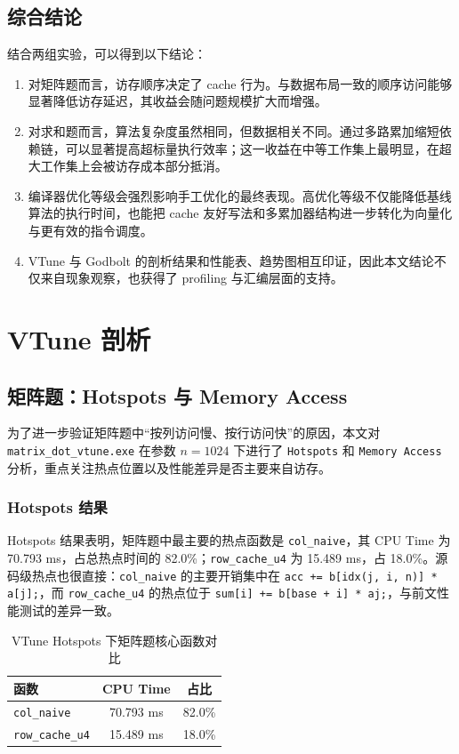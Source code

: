 \documentclass[a4paper]{article}
\begin{document}
\subsection{综合结论}
结合两组实验，可以得到以下结论：
\begin{enumerate}
 \item 对矩阵题而言，访存顺序决定了 cache 行为。与数据布局一致的顺序访问能够显著降低访存延迟，其收益会随问题规模扩大而增强。
  \item 对求和题而言，算法复杂度虽然相同，但数据相关不同。通过多路累加缩短依赖链，可以显著提高超标量执行效率；这一收益在中等工作集上最明显，在超大工作集上会被访存成本部分抵消。
  \item 编译器优化等级会强烈影响手工优化的最终表现。高优化等级不仅能降低基线算法的执行时间，也能把 cache 友好写法和多累加器结构进一步转化为向量化与更有效的指令调度。
  \item VTune 与 Godbolt 的剖析结果和性能表、趋势图相互印证，因此本文结论不仅来自现象观察，也获得了 profiling 与汇编层面的支持。
\end{enumerate}

\section{VTune 剖析}
\subsection{矩阵题：Hotspots 与 Memory Access}
为了进一步验证矩阵题中“按列访问慢、按行访问快”的原因，本文对 \texttt{matrix\_dot\_vtune.exe} 在参数 $n=1024$ 下进行了 \texttt{Hotspots} 和 \texttt{Memory Access} 分析，重点关注热点位置以及性能差异是否主要来自访存。

\subsubsection{Hotspots 结果}
Hotspots 结果表明，矩阵题中最主要的热点函数是 \texttt{col\_naive}，其 CPU Time 为 70.793 ms，占总热点时间的 82.0\%；\texttt{row\_cache\_u4} 为 15.489 ms，占 18.0\%。源码级热点也很直接：\texttt{col\_naive} 的主要开销集中在 \texttt{acc += b[idx(j, i, n)] * a[j];}，而 \texttt{row\_cache\_u4} 的热点位于 \texttt{sum[i] += b[base + i] * aj;}，与前文性能测试的差异一致。

\begin{table}[H]
  \centering
  \begin{tabular}{lcc}
  \toprule
  函数 & CPU Time & 占比 \\
  \midrule
  \texttt{col\_naive} & 70.793 ms & 82.0\% \\
  \texttt{row\_cache\_u4} & 15.489 ms & 18.0\% \\
  \bottomrule
  \end{tabular}
  \caption{VTune Hotspots 下矩阵题核心函数对比}
  \label{tab:vtune-matrix-hotspots}
\end{table}
\end{document}
